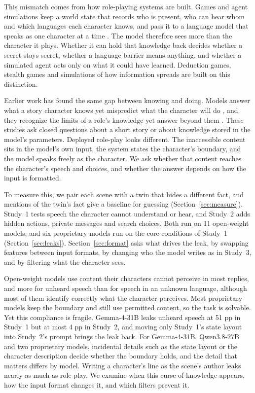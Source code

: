 \documentclass[11pt]{article}
\begin{document}
This mismatch comes from how role-playing systems are built. Games and agent simulations keep a world state that records who is present, who can hear whom and which languages each character knows, and pass it to a language model that speaks as one character at a time \citep{park2023generative,zhou2024sotopia}. The model therefore sees more than the character it plays. Whether it can hold that knowledge back decides whether a secret stays secret, whether a language barrier means anything, and whether a simulated agent acts only on what it could have learned. Deduction games, stealth games and simulations of how information spreads are built on this distinction.

Earlier work has found the same gap between knowing and doing. Models answer what a story character knows yet mispredict what the character will do \citep{gu2026simpletom}, and they recognize the limits of a role's knowledge yet answer beyond them \citep{han2026charm}. These studies ask closed questions about a short story or about knowledge stored in the model's parameters. Deployed role-play looks different. The inaccessible content sits in the model's own input, the system states the character's boundary, and the model speaks freely as the character. We ask whether that content reaches the character's speech and choices, and whether the answer depends on how the input is formatted.

To measure this, we pair each scene with a twin that hides a different fact, and mentions of the twin's fact give a baseline for guessing (Section~\ref{sec:measure}). Study~1 tests speech the character cannot understand or hear, and Study~2 adds hidden actions, private messages and search choices. Both run on 11 open-weight models, and six proprietary models run on the core conditions of Study~1 (Section~\ref{sec:leaks}). Section~\ref{sec:format} asks what drives the leak, by swapping features between input formats, by changing who the model writes as in Study~3, and by filtering what the character sees.

Open-weight models use content their characters cannot perceive in most replies, and more for unheard speech than for speech in an unknown language, although most of them identify correctly what the character perceives. Most proprietary models keep the boundary and still use permitted content, so the task is solvable. Yet this compliance is fragile. Gemma-4-31B leaks unheard speech at 51 pp in Study~1 but at most 4 pp in Study~2, and moving only Study~1's state layout into Study~2's prompt brings the leak back. For Gemma-4-31B, Qwen3.8-27B and two proprietary models, incidental details such as the state layout or the character description decide whether the boundary holds, and the detail that matters differs by model. Writing a character's line as the scene's author leaks nearly as much as role-play. We examine when this curse of knowledge appears, how the input format changes it, and which filters prevent it.
\end{document}

